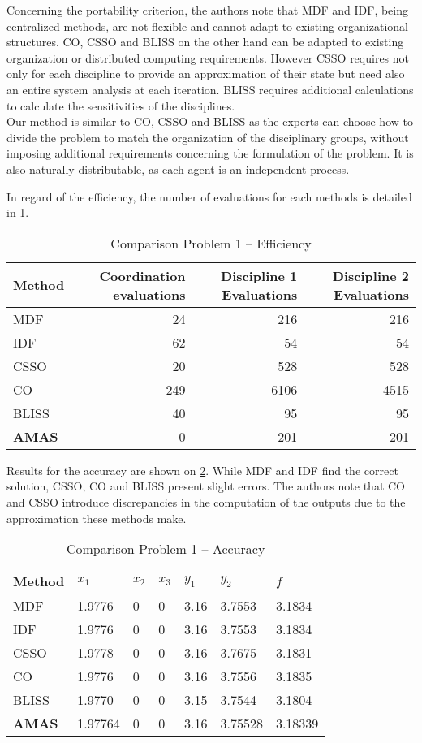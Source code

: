 Concerning the portability criterion, the authors note that  MDF and IDF, being centralized methods, are not flexible and cannot adapt to existing organizational structures. CO, CSSO and BLISS on the other hand can be adapted to existing organization or distributed computing requirements. However CSSO requires not only for each discipline to provide an approximation of their state but need also an entire system analysis at each iteration. BLISS requires additional calculations to calculate the sensitivities of the disciplines.\\
Our method is similar to CO, CSSO and BLISS as the experts can choose how to divide the problem to match the organization of the disciplinary groups, without imposing additional requirements concerning the formulation of the problem. It is also naturally distributable, as each agent is an independent process.

In regard of the efficiency, the number of evaluations for each methods is detailed in \tablename{} \ref{bench1_efficiency}.

\begin{table}
\caption{Comparison Problem 1 -- Efficiency}\label{bench1_efficiency}
\centering
\begin{tabular}{lrrr}
\toprule
Method & Coordination evaluations & Discipline 1 Evaluations & Discipline 2 Evaluations\\
\midrule
MDF					&	24	&	216		&	216	\\
IDF						&	62	&	54		&	54	\\
CSSO					&	20	&	528		&	528	\\
CO						&	249	&	6106	&	4515	\\
BLISS					&	40	&	95		&	95	\\
\textbf{AMAS}	&	0	&	201	&	201	\\
\bottomrule
\end{tabular}
\end{table}

Results for the accuracy are shown on \tablename{} \ref{bench1_accuracy}. While MDF and IDF find the correct solution, CSSO, CO and BLISS present slight errors. The authors note that CO and CSSO introduce discrepancies in the computation of the outputs due to the approximation these methods make.

\begin{table}
\caption{Comparison Problem 1 -- Accuracy}\label{bench1_accuracy}
\centering
\begin{tabular}{lllllll}
\toprule
Method & $x_1$ & $x_2$ & $x_3$ & $y_1$ & $y_2$ & $f$ \\
\midrule
MDF					&	1.9776	&	0	&	0	&	3.16	&	3.7553	&	3.1834	\\
IDF						&	1.9776	&	0	&	0	&	3.16	&	3.7553	&	3.1834	\\
CSSO					&	1.9778	&	0	&	0	&	3.16	&	3.7675	&	3.1831	\\
CO						&	1.9776	&	0	&	0	&	3.16	&	3.7556	&	3.1835	\\
BLISS					&	1.9770 	&	0	&	0	&	3.15	&	3.7544	&	3.1804	\\
\textbf{AMAS}	&	1.97764	&	0	&	0	&	3.16	&	3.75528	&	3.18339	\\
\bottomrule
\end{tabular}
\end{table}

